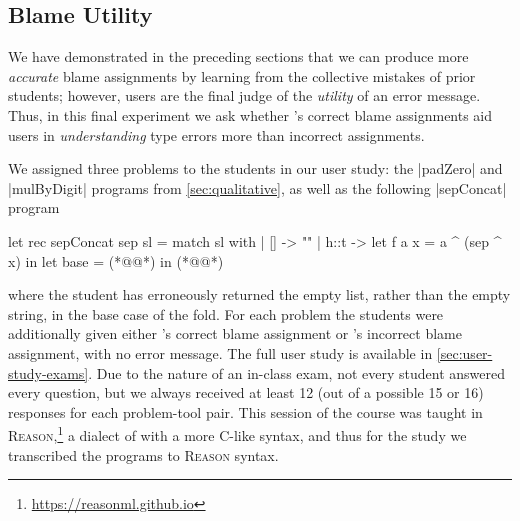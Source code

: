 \subsection{Blame Utility}
\label{sec:user-study}



We have demonstrated in the preceding sections that we can produce
more \emph{accurate} blame assignments by learning from the collective
mistakes of prior students; however, users are the final judge of
the \emph{utility} of an error message.
%
Thus, in this final experiment we ask whether \toolname's correct blame
assignments aid users in \emph{understanding} type errors
more than incorrect assignments.

We assigned three problems to the students in our user study: the
|padZero| and |mulByDigit| programs from \autoref{sec:qualitative}, as
well as the following |sepConcat| program
%
\begin{ecode}
  let rec sepConcat sep sl =
    match sl with
    | [] -> ""
    | h::t ->
        let f a x = a ^ (sep ^ x) in
        let base = (*@\hlTree{[]}@*) in
        (*@@*)
\end{ecode}
%
where the student has erroneously returned the empty list, rather than
the empty string, in the base case of the fold.
%
For each problem the students were additionally given either \toolname's
correct blame assignment or \sherrloc's incorrect blame assignment,
with no error message.
%
The full user study is available in \autoref{sec:user-study-exams}.
%
Due to the nature of an in-class exam, not every student answered every
question, but we always received at least 12 (out of a possible 15 or
16) responses for each problem-tool pair.
%
This session of the course
was taught in \textsc{Reason},\footnote{\url{https://reasonml.github.io}}
a dialect of \ocaml with a more C-like syntax, and thus for the study
we transcribed the programs to \textsc{Reason} syntax.

